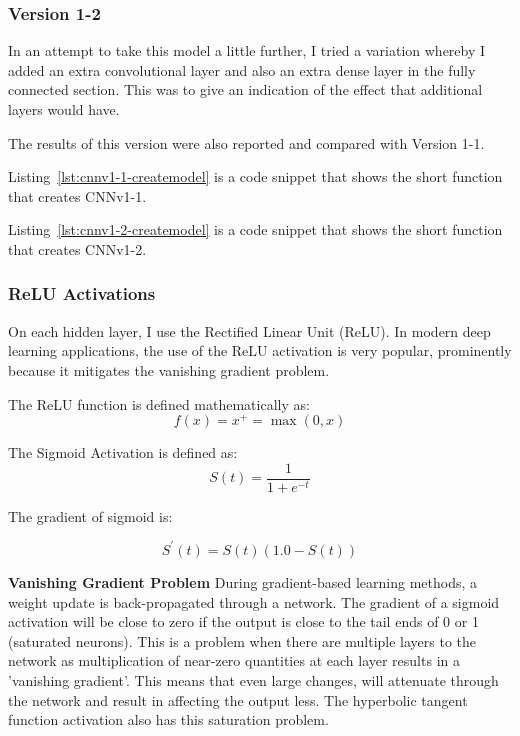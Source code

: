 \documentclass[12pt,a4paper,twoside]{report}
\begin{document}
\subsubsection{Version 1-2}
In an attempt to take this model a little further, I tried a variation whereby I added an extra convolutional layer and also an extra dense layer in the fully connected section. This was to give an indication of the effect that additional layers would have.

The results of this version were also reported and compared with Version 1-1. 

Listing~\ref{lst:cnnv1-1-createmodel} is a code snippet that shows the short function that creates CNNv1-1. 



Listing~\ref{lst:cnnv1-2-createmodel} is a code snippet that shows the short function that creates CNNv1-2. 





\subsubsection{ReLU Activations}

On each hidden layer, I use the Rectified Linear Unit (ReLU). In modern deep learning applications, the use of the ReLU activation is very popular, prominently because it mitigates the vanishing gradient problem. 

The ReLU function is defined mathematically as:
$$f ( x ) = x ^ { + } = \max ( 0,x )$$

The Sigmoid Activation is defined as:
$$S ( t ) = \frac { 1} { 1+ e ^ { - t } }$$

The gradient of sigmoid is:

$$S ^ { \prime } ( t ) = S ( t ) ( 1.0- S ( t ) )$$

\textbf{Vanishing Gradient Problem}
During gradient-based learning methods, a weight update is back-propagated through a network. The gradient of a sigmoid activation will be close to zero if the output is close to the tail ends of 0 or 1 (saturated neurons). This is a problem when there are multiple layers to the network as multiplication of near-zero quantities at each layer results in a 'vanishing gradient'. This means that even large changes, will attenuate through the network and result in affecting the output less. The hyperbolic tangent function activation also has this saturation problem. 
\end{document}
